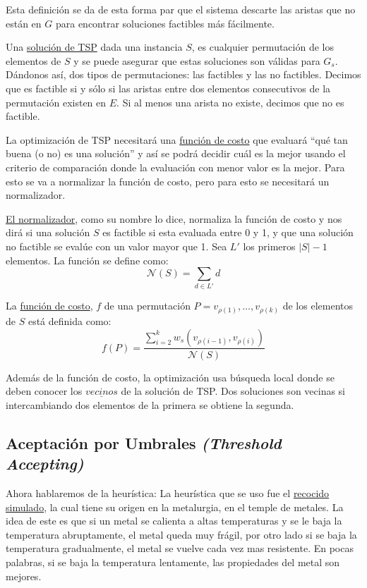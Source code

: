 \documentclass{article}
\begin{document}
Esta definición se da de esta forma par que el sistema descarte las aristas que no están en $G$ para encontrar soluciones factibles más fácilmente.

Una \underline{solución de TSP} dada una instancia $S$, es cualquier permutación de los elementos de $S$ y se puede asegurar que estas soluciones son válidas para $G_s$. Dándonos así, dos tipos de permutaciones: las factibles y las no factibles. Decimos que es factible si y sólo si las aristas entre dos elementos consecutivos de la permutación existen en $E$. Si al menos una arista no existe, decimos que no es factible.


La optimización de TSP necesitará una \underline{función de costo} que evaluará ``qué tan buena (o no) es una solución'' y así se podrá decidir cuál es la mejor usando el criterio de comparación donde la evaluación con menor valor es la mejor. Para esto se va a normalizar la función de costo, pero para esto se necesitará un normalizador.

\underline{El normalizador}, como su nombre lo dice, normaliza la función de costo y nos dirá si una solución $S$ es factible si esta evaluada entre 0 y 1, y que una solución no factible se evalúe con un valor mayor que 1. Sea $L'$ los primeros $|S|-1$ elementos. La función se define como:
\[
\mathcal{N}(S) = \sum_{d \in L'}d
\]

La \underline{función de costo}, $f$ de una permutación $P = v_{\rho(1)}, \ldots, v_{\rho(k)}$ de los elementos de $S$ está definida como:
\[
    f(P) = \frac{\sum_{i=2}^{k} w_s(v_{\rho(i-1)}, v_{\rho(i)})}{\mathcal{N}(S)}
\]

Además de la función de costo, la optimización usa búsqueda local donde se deben conocer los $\underline{vecinos}$ de la solución de TSP. Dos soluciones son vecinas si intercambiando dos elementos de la primera se obtiene la segunda.

\subsection{Aceptación por Umbrales \emph{(Threshold Accepting)}}
Ahora hablaremos de la heurística: La heurística que se uso fue el \underline{recocido simulado}, la cual tiene su origen en la metalurgia, en el temple de metales. La idea de este es que si un metal se calienta a altas temperaturas y se le baja la temperatura abruptamente, el metal queda muy frágil, por otro lado si se baja la temperatura gradualmente, el metal se vuelve cada vez mas resistente. En pocas palabras, si se baja la temperatura lentamente, las propiedades del metal son mejores.
\end{document}

